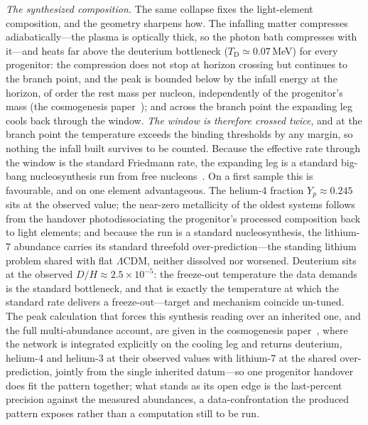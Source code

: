\documentclass[11pt,a4paper]{article}
\theoremstyle{plain}
\theoremstyle{definition}
\theoremstyle{remark}
\begin{document}
\emph{The synthesized composition.} The same collapse fixes the light-element composition, and the geometry sharpens how. The infalling matter compresses adiabatically---the plasma is optically thick, so the photon bath compresses with it---and heats far above the deuterium bottleneck ($T_{\mathrm{D}}\simeq0.07\,$MeV) for every progenitor: the compression does not stop at horizon crossing but continues to the branch point, and the peak is bounded below by the infall energy at the horizon, of order the rest mass per nucleon, independently of the progenitor's mass (the cosmogenesis paper~\cite{JanzenCosmogenesis}); and across the branch point the expanding leg cools back through the window. \emph{The window is therefore crossed twice}, and at the branch point the temperature exceeds the binding thresholds by any margin, so nothing the infall built survives to be counted. Because the effective rate through the window is the standard Friedmann rate, the expanding leg is a standard big-bang nucleosynthesis run from free nucleons~\cite{JanzenCosmogenesis}. On a first sample this is favourable, and on one element advantageous. The helium-4 fraction $Y_p\approx0.245$ sits at the observed value; the near-zero metallicity of the oldest systems follows from the handover photodissociating the progenitor's processed composition back to light elements; and because the run is a standard nucleosynthesis, the lithium-7 abundance carries its standard threefold over-prediction---the standing lithium problem shared with flat $\Lambda$CDM, neither dissolved nor worsened. Deuterium sits at the observed $D/H\approx2.5\times10^{-5}$: the freeze-out temperature the data demands is the standard bottleneck, and that is exactly the temperature at which the standard rate delivers a freeze-out---target and mechanism coincide un-tuned. The peak calculation that forces this synthesis reading over an inherited one, and the full multi-abundance account, are given in the cosmogenesis paper~\cite{JanzenCosmogenesis}, where the network is integrated explicitly on the cooling leg and returns deuterium, helium-4 and helium-3 at their observed values with lithium-7 at the shared over-prediction, jointly from the single inherited datum---so one progenitor handover does fit the pattern together; what stands as its open edge is the last-percent precision against the measured abundances, a data-confrontation the produced pattern exposes rather than a computation still to be run.
\end{document}
